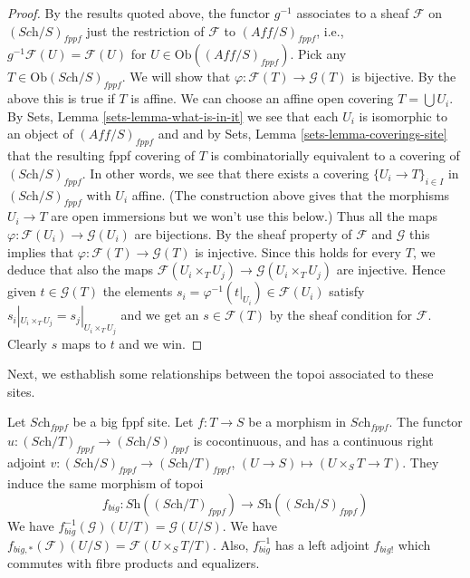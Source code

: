 \begin{proof}
\medskip\noindent
By the results quoted above,
the functor $g^{-1}$ associates to a sheaf $\mathcal{F}$ on
$(\textit{Sch}/S)_{fppf}$ just the restriction of $\mathcal{F}$
to $(\textit{Aff}/S)_{fppf}$, i.e., $g^{-1}\mathcal{F}(U) = \mathcal{F}(U)$
for $U \in \text{Ob}((\textit{Aff}/S)_{fppf})$. Pick any
$T \in \text{Ob}(\textit{Sch}/S)_{fppf}$. We will show that
$\varphi : \mathcal{F}(T) \to \mathcal{G}(T)$ is bijective.
By the above this is true if $T$ is affine.
We can choose an affine open covering $T = \bigcup U_i$. By
Sets, Lemma \ref{sets-lemma-what-is-in-it} we see that
each $U_i$ is isomorphic to an object of $(\textit{Aff}/S)_{fppf}$
and and by Sets, Lemma \ref{sets-lemma-coverings-site}
that the resulting fppf covering of $T$ is combinatorially
equivalent to a covering of $(\textit{Sch}/S)_{fppf}$.
In other words, we see that there exists a covering
$\{U_i \to T\}_{i \in I}$ in $(\textit{Sch}/S)_{fppf}$ with $U_i$ affine.
(The construction above gives that the morphisms $U_i \to T$ are open
immersions but we won't use this below.)
Thus all the maps $\varphi : \mathcal{F}(U_i) \to \mathcal{G}(U_i)$
are bijections. By the sheaf property of $\mathcal{F}$ and $\mathcal{G}$
this implies that $\varphi : \mathcal{F}(T) \to \mathcal{G}(T)$ is injective.
Since this holds for every $T$, we deduce that also the maps
$\mathcal{F}(U_i \times_T U_j) \to \mathcal{G}(U_i \times_T U_j)$
are injective. Hence given $t \in \mathcal{G}(T)$
the elements $s_i = \varphi^{-1}(t|_{U_i}) \in \mathcal{F}(U_i)$
satisfy $s_i|_{U_i \times_T U_j} = s_j|_{U_i \times_T U_j}$
and we get an $s \in \mathcal{F}(T)$ by the sheaf condition
for $\mathcal{F}$. Clearly $s$ maps to $t$ and we win.
\end{proof}

\noindent
Next, we esthablish some relationships between the topoi
associated to these sites.

\begin{lemma}
\label{lemma-morphism-big-fppf}
Let $\textit{Sch}_{fppf}$ be a big fppf site.
Let $f : T \to S$ be a morphism in $\textit{Sch}_{fppf}$.
The functor $u : (\textit{Sch}/T)_{fppf} \to (\textit{Sch}/S)_{fppf}$
is cocontinuous, and has a continuous right adjoint
$v : (\textit{Sch}/S)_{fppf} \to (\textit{Sch}/T)_{fppf}$,
$(U \to S) \mapsto (U \times_S T \to T)$. They induce the same morphism
of topoi
$$
f_{big} :
\textit{Sh}((\textit{Sch}/T)_{fppf})
\longrightarrow
\textit{Sh}((\textit{Sch}/S)_{fppf})
$$
We have $f_{big}^{-1}(\mathcal{G})(U/T) = \mathcal{G}(U/S)$.
We have $f_{big, *}(\mathcal{F})(U/S) = \mathcal{F}(U\times_ST/T)$.
Also, $f_{big}^{-1}$ has a left adjoint $f_{big!}$ which commutes with
fibre products and equalizers.
\end{lemma}

